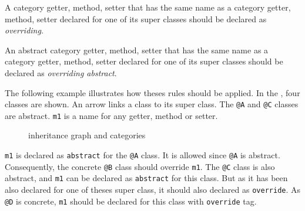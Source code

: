 A category getter, method, setter that has the same name as a category getter, method, setter declared for one of its super classes should be declared as \emph{overriding}.

An abstract category getter, method, setter that has the same name as a category getter, method, setter declared for one of its super classes should be declared as \emph{overriding abstract}.

The following example illustrates how theses rules should be applied. In the , four classes are shown. An arrow links a class to its super class. The \lstinline[language=galgas]!@A! and \lstinline[language=galgas]!@C! classes are abstract. \lstinline[language=galgas]!m1! is a name for any getter, method or setter.

\begin{figure}[t]
  \centering
  \caption{inheritance graph and categories}
  \ligne
\end{figure}

\lstinline[language=galgas]!m1! is declared as \lstinline[language=galgas]!abstract! for the \lstinline[language=galgas]!@A! class. It is allowed since \lstinline[language=galgas]!@A! is abstract. Consequently, the concrete \lstinline[language=galgas]!@B! class should override \lstinline[language=galgas]!m1!. The \lstinline[language=galgas]!@C! class is also abstract, and \lstinline[language=galgas]!m1! can be declared as \lstinline[language=galgas]!abstract! for this class. But as it has been also declared for one of theses super class, it should also declared as \lstinline[language=galgas]!override!. As \lstinline[language=galgas]!@D! is concrete, \lstinline[language=galgas]!m1! should be declared for this class with \lstinline[language=galgas]!override! tag.










